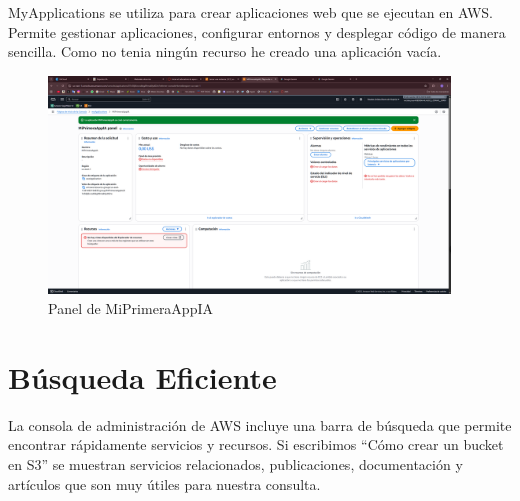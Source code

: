 \documentclass{article}
\begin{document}
	MyApplications se utiliza para crear aplicaciones web que se ejecutan en AWS. Permite gestionar aplicaciones, configurar entornos y desplegar código de manera sencilla. Como no tenia ningún recurso he creado una aplicación vacía.

	\begin{figure}[h!]
	\centering
	\includegraphics[width=0.95\textwidth]{tarea_4.png}
	\caption{Panel de MiPrimeraAppIA}
	\end{figure}

	\newpage

	\section{Búsqueda Eficiente}

	La consola de administración de AWS incluye una barra de búsqueda que permite encontrar rápidamente servicios y recursos. Si escribimos ``Cómo crear un bucket en S3'' se muestran servicios relacionados, publicaciones, documentación y artículos que son muy útiles para nuestra consulta.
\end{document}
